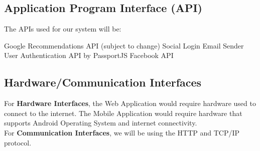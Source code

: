 \subsection{Application Program Interface (API)}
The APIs used for our system will be: 
\begin{outline}
    \1 Google Recommendations API (subject to change)
    \1 Social Login
    \1 Email Sender
    \1 User Authentication API by PassportJS
    \1 Facebook API
\end{outline}

\subsection{Hardware/Communication Interfaces}
For \textbf{Hardware Interfaces}, the Web Application would require hardware used to connect to the internet. The Mobile Application would require hardware that supports Android Operating System and internet connectivity. \\ For \textbf{Communication Interfaces}, we will be using the HTTP and TCP/IP protocol.

